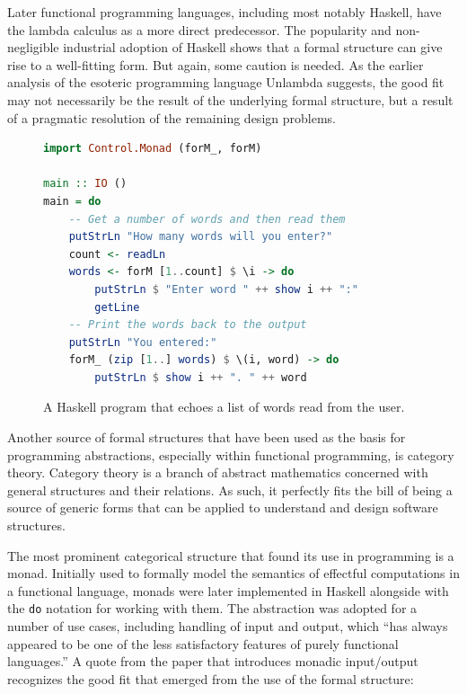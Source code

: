 Later functional programming languages, including most notably Haskell, have the lambda
calculus as a more direct predecessor. The popularity and non-negligible industrial adoption
of Haskell shows that a formal structure can give rise to a well-fitting form.
But again, some caution is needed. As the earlier analysis of the esoteric programming language
Unlambda suggests, the good fit may not necessarily be the result of the underlying formal
structure, but a result of a pragmatic resolution of the remaining design problems.



\begin{figure}
\centering
\vspace{-1em}
\begin{minipage}[t]{.5\textwidth}%
\begin{lstlisting}[language=haskell]
import Control.Monad (forM_, forM)

main :: IO ()
main = do
    -- Get a number of words and then read them
    putStrLn "How many words will you enter?"
    count <- readLn
    words <- forM [1..count] $ \i -> do
        putStrLn $ "Enter word " ++ show i ++ ":"
        getLine
    -- Print the words back to the output
    putStrLn "You entered:"
    forM_ (zip [1..] words) $ \(i, word) -> do
        putStrLn $ show i ++ ". " ++ word
\end{lstlisting}
\end{minipage}
\vspace{-0.5em}
\caption{A Haskell program that echoes a list of words read from the user.}
\label{fig:monads}
\vspace{-0.5em}
\end{figure}

Another source of formal structures that have been used as the basis for programming
abstractions, especially within functional programming, is category theory. Category theory
is a branch of abstract mathematics concerned with general structures and their relations.
As such, it perfectly fits the bill of being a source of generic forms that can be applied
to understand and design software structures.

The most prominent categorical structure that found its use in programming
is a monad. Initially used to formally model the semantics of effectful computations in a
functional language, monads were later implemented in Haskell alongside with the
\texttt{do} notation for working with them. The abstraction was adopted for a number of
use cases, including handling of input and output, which ``has always appeared to be one of
the less satisfactory features of purely functional languages.''
A quote from the paper that introduces monadic input/output recognizes the good fit
that emerged from the use of the formal structure:

